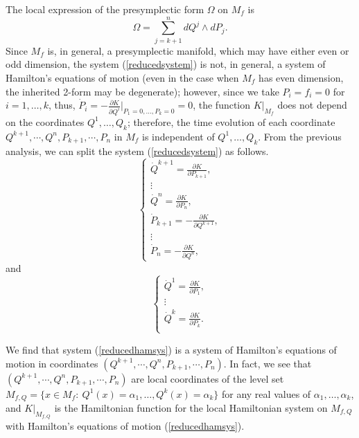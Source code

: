 \documentclass[10pt,a4paper]{article}
\begin{document}
The local expression of the presymplectic form $\Omega$ on $M_{f}$ is
\begin{equation*}
\Omega=\sum_{j=k+1}^{n}dQ^{j}\wedge dP_{j}.
\end{equation*}
Since $M_{f}$ is, in general, a presymplectic manifold, which may have either even or odd dimension, the system (\ref{reducedsystem}) is not, in general, a system of Hamilton's equations of motion (even in the case when $M_{f}$ has even dimension, the inherited 2-form may be degenerate); however, since we take $P_{i}=f_{i}=0$ for $i=1,\ldots,k$, thus, $\dot{P}_{i}=-\frac{\partial K}{\partial Q^{i}}\big|_{{P_1=0,\ldots,P_k=0}}=0$, the function $K\big|_{M_{f}}$ does not depend on the coordinates $Q^{1},\ldots,Q_{k}$; therefore, the time evolution of each coordinate $Q^{k+1},\cdots,Q^{n},P_{k+1},\cdots,P_{n}$ in $M_{f}$ is independent of $Q^{1},\ldots,Q_{k}$. From the previous analysis, we can split the system (\ref{reducedsystem}) as follows.
\begin{equation}
\label{reducedhamsys}
\left\lbrace \begin{array}{c}
\dot{Q}^{k+1}= \frac{\partial K}{\partial P_{k+1}},\\
\vdots\\
\dot{Q}^{n}= \frac{\partial K}{\partial P_{n}},\\ 
\dot{P}_{k+1}= -\frac{\partial K}{\partial Q^{k+1}},\\
\vdots\\
\dot{P}_{n}= -\frac{\partial K}{\partial Q^{n}},
\end{array} \right.
\end{equation}
and
\begin{equation}
\label{inteq}
\left\lbrace \begin{array}{c}
\dot{Q}^{1}= \frac{\partial K}{\partial P_{1}},\\ 
\vdots \\ 
\dot{Q}^{k}= \frac{\partial K}{\partial P_{k}}.\\ 
\end{array} \right.
\end{equation}

We find that system (\ref{reducedhamsys}) is a system of Hamilton's equations of motion in coordinates $(Q^{k+1},\cdots,Q^{n},P_{k+1},\cdots,P_{n})$. In fact, we see that $(Q^{k+1},\cdots,Q^{n},P_{k+1},\cdots,P_{n})$ are local coordinates of the level set $M_{f,Q}=\lbrace x\in M_{f}:\ Q^{1}(x)=\alpha_{1},\ldots,Q^{k}(x)=\alpha_{k} \rbrace$ for any real values of $\alpha_{1},\ldots,\alpha_{k}$, and $K\big|_{M_{f,Q}}$ is the Hamiltonian function for the local Hamiltonian system on $M_{f,Q}$ with Hamilton's equations of motion (\ref{reducedhamsys}).
\end{document}
